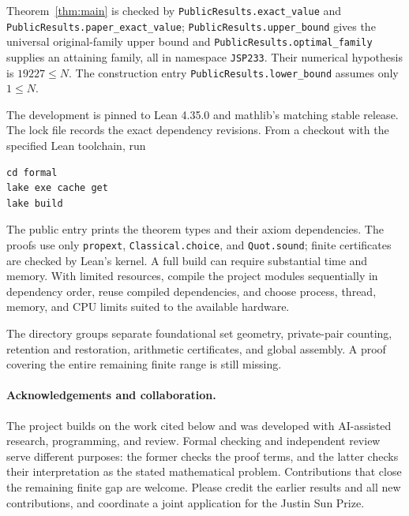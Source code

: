 \documentclass[11pt,a4paper]{article}
\theoremstyle{definition}\newtheorem{definition}[theorem]{Definition}
\newcommand{\code}[1]{{\small\nolinkurl{#1}}}
\begin{document}
Theorem~\ref{thm:main} is checked by
\code{PublicResults.exact_value} and
\code{PublicResults.paper_exact_value};
\code{PublicResults.upper_bound} gives the universal original-family
upper bound and \code{PublicResults.optimal_family} supplies an attaining
family, all in namespace \code{JSP233}. Their numerical hypothesis is
$19227\le N$. The construction entry
\code{PublicResults.lower_bound} assumes only $1\le N$.

The development is pinned to Lean 4.35.0 and mathlib's matching stable
release. The lock file records the exact dependency revisions. From a
checkout with the specified Lean toolchain, run
\begin{verbatim}
cd formal
lake exe cache get
lake build
\end{verbatim}
The public entry prints the theorem types and their axiom dependencies.
The proofs use only \code{propext}, \code{Classical.choice}, and
\code{Quot.sound}; finite certificates are checked by Lean's kernel.
A full build can require substantial time and memory. With limited
resources, compile the project modules sequentially in dependency order,
reuse compiled dependencies, and choose process, thread, memory, and CPU
limits suited to the available hardware.

The directory groups separate foundational set geometry, private-pair
counting, retention and restoration, arithmetic certificates, and global
assembly. A proof covering the entire remaining finite range is still
missing.

\paragraph{Acknowledgements and collaboration.}
The project builds on the work cited below and was developed with
AI-assisted research, programming, and review. Formal checking and
independent review serve different purposes: the former checks the
proof terms, and the latter checks their interpretation as the stated
mathematical problem. Contributions that close the remaining finite gap
are welcome. Please credit the earlier results and all new contributions,
and coordinate a joint application for the Justin Sun Prize.
\end{document}
